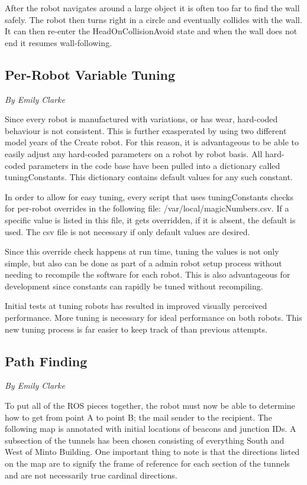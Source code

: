\documentclass[12pt]{report}
\newcommand{\sectionAuthor}[1]{{\small\vspace{-1em}\textit{#1}}\bigskip\par}
\begin{document}
After the robot navigates around a large object it is often too far to find the wall safely. The robot then turns right in a circle and eventually collides with the wall. It can then re-enter the HeadOnCollisionAvoid state and when the wall does not end it resumes wall-following.

\subsection{Per-Robot Variable Tuning}
\sectionAuthor{By Emily Clarke}
Since every robot is manufactured with variations, or has wear, hard-coded behaviour is not consistent. This is further exasperated by using two different model years of the Create robot. For this reason, it is advantageous to be able to easily adjust any hard-coded parameters on a robot by robot basis. All hard-coded parameters in the code base have been pulled into a dictionary called tuningConstants. This dictionary contains default values for any such constant.

In order to allow for easy tuning, every script that uses tuningConstants checks for per-robot overrides in the following file: /var/local/magicNumbers.csv. If a specific value is listed in this file, it gets overridden, if it is absent, the default is used. The csv file is not necessary if only default values are desired.

Since this override check happens at run time, tuning the values is not only simple, but also can be done as part of a admin robot setup process without needing to recompile the software for each robot. This is also advantageous for development since constants can rapidly be tuned without recompiling.

Initial tests at tuning robots has resulted in improved visually perceived performance. More tuning is necessary for ideal performance on both robots. This new tuning process is far easier to keep track of than previous attempts.

\subsection{Path Finding}
\sectionAuthor{By Emily Clarke}
To put all of the ROS pieces together, the robot must now be able to determine how to get from point A to point B; the mail sender to the recipient. The following map is annotated with initial locations of beacons and junction IDs. A subsection of the tunnels has been chosen consisting of everything South and West of Minto Building. One important thing to note is that the directions listed on the map are to signify the frame of reference for each section of the tunnels and are not necessarily true cardinal directions.
\end{document}
